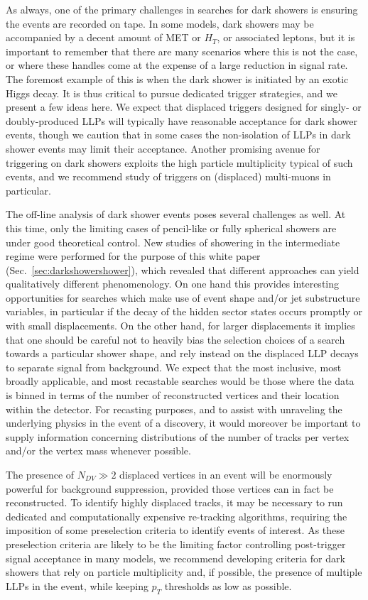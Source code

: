 As always, one of the primary challenges in searches for dark showers is ensuring the events are recorded on tape.  In some models, dark showers may be accompanied by a decent amount of MET or $H_T$, or associated leptons, but it is important to remember that there are many scenarios where this is not the case, or where these handles come at the expense of a large reduction in signal rate. The foremost example of this is when the dark shower is initiated by an exotic Higgs decay.  It is thus critical to pursue dedicated trigger strategies, and we present a few ideas here. We expect that displaced triggers designed for singly- or doubly-produced LLPs will typically have reasonable acceptance for dark shower events, though we caution that in some cases the non-isolation of LLPs in dark shower events may limit their acceptance.  Another promising avenue for triggering on dark showers exploits the high particle multiplicity typical of such events, and we recommend study of triggers on (displaced) multi-muons in particular.  

The off-line analysis of dark shower events poses several challenges as well.  At this time, only the limiting cases of pencil-like or fully spherical showers are under good theoretical control.  New studies of showering in the intermediate regime were performed for the purpose of this white paper (Sec.~\ref{sec:darkshowershower}), which revealed that different approaches can yield qualitatively different phenomenology.  On one hand this provides interesting opportunities for searches which make use of event shape and/or jet substructure variables, in particular if the decay of the hidden sector states occurs promptly or with small displacements. On the other hand, for larger displacements it implies that one should be careful not to heavily bias the selection choices of a search towards a particular shower shape, and rely instead on the displaced LLP decays to separate signal from background.  We expect that the most inclusive, most broadly applicable, and most recastable searches would be those where the data is binned in terms of the number of reconstructed vertices and their  location within the detector.  For recasting purposes, and to assist with unraveling the underlying physics in the event of a discovery, it would moreover be important to supply information concerning distributions of the number of tracks per vertex and/or the vertex mass whenever possible.

The presence of $N_{DV}\gg 2$ displaced vertices in an event will be enormously powerful for background suppression, provided those vertices can in fact be reconstructed. To identify highly displaced tracks, it may be necessary to run dedicated and  computationally expensive re-tracking algorithms,  requiring the imposition of some preselection criteria to identify events of interest.   As these preselection criteria are likely to be the limiting factor controlling post-trigger signal acceptance in many models, we recommend developing criteria for dark showers that rely on particle multiplicity and, if possible,  the presence of multiple LLPs in the event, while keeping $p_T$ thresholds as low as possible.  \\

